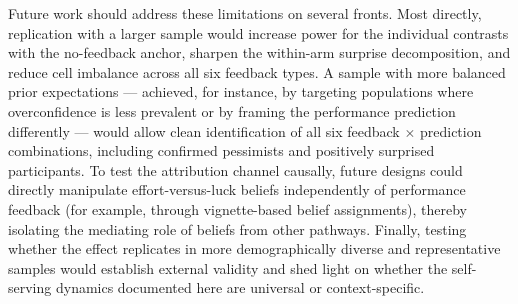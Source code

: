 \documentclass[12pt]{article}
\begin{document}
Future work should address these limitations on several fronts.
Most directly, replication with a larger sample would increase power for
the individual contrasts with the no-feedback anchor, sharpen the
within-arm surprise decomposition, and reduce cell imbalance across all six
feedback types.
A sample with more balanced prior expectations --- achieved, for instance,
by targeting populations where overconfidence is less prevalent or by
framing the performance prediction differently --- would allow clean
identification of all six feedback $\times$ prediction combinations,
including confirmed pessimists and positively surprised participants.
To test the attribution channel causally, future designs could directly
manipulate effort-versus-luck beliefs independently of performance feedback
(for example, through vignette-based belief assignments), thereby isolating
the mediating role of beliefs from other pathways.
Finally, testing whether the effect replicates in more demographically
diverse and representative samples would establish external validity and shed
light on whether the self-serving dynamics documented here are universal or
context-specific.

\end{document}
